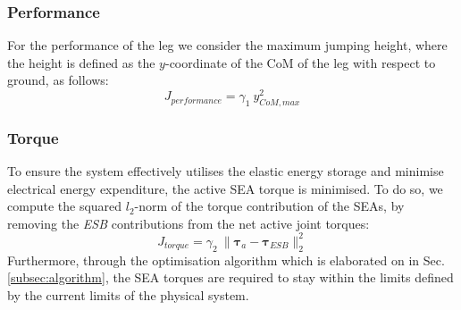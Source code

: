 \documentclass[letterpaper, 10 pt, conference]{ieeeconf}  %
\begin{document}
\subsubsection{Performance}
For the performance of the leg we consider the maximum jumping height, where the height is defined as the $y$-coordinate of the CoM of the leg with respect to ground, as follows:
\begin{equation}
	J_{performance} = \gamma_1 \: y_{CoM,max}^2
\end{equation}


\subsubsection{Torque}
To ensure the system effectively utilises the elastic energy storage and minimise electrical energy expenditure, the active SEA torque is minimised. To do so, we compute the squared $l_2$-norm of the torque contribution of the SEAs, by removing the \textit{ESB} contributions from the net active joint torques:
\begin{equation}
	J_{torque}= \gamma_2 \: \| \boldsymbol{\tau}_a - \boldsymbol{\tau}_{ESB} \|_2^2
\end{equation}
Furthermore, through the optimisation algorithm which is elaborated on in Sec. \ref{subsec:algorithm}, the SEA torques are required to stay within the limits defined by the current limits of the physical system.
\end{document}

